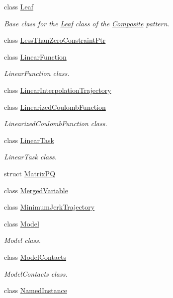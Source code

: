 \begin{DoxyCompactItemize}
class \hyperlink{classocra_1_1Leaf}{Leaf}
\begin{DoxyCompactList}\small\item\em Base class for the \hyperlink{classocra_1_1Leaf}{Leaf} class of the \hyperlink{classocra_1_1Composite}{Composite} pattern. \end{DoxyCompactList}\item 
class \hyperlink{classocra_1_1LessThanZeroConstraintPtr}{Less\+Than\+Zero\+Constraint\+Ptr}
\item 
class \hyperlink{classocra_1_1LinearFunction}{Linear\+Function}
\begin{DoxyCompactList}\small\item\em Linear\+Function class. \end{DoxyCompactList}\item 
class \hyperlink{classocra_1_1LinearInterpolationTrajectory}{Linear\+Interpolation\+Trajectory}
\item 
class \hyperlink{classocra_1_1LinearizedCoulombFunction}{Linearized\+Coulomb\+Function}
\begin{DoxyCompactList}\small\item\em Linearized\+Coulomb\+Function class. \end{DoxyCompactList}\item 
class \hyperlink{classocra_1_1LinearTask}{Linear\+Task}
\begin{DoxyCompactList}\small\item\em Linear\+Task class. \end{DoxyCompactList}\item 
struct \hyperlink{structocra_1_1MatrixPQ}{Matrix\+PQ}
\item 
class \hyperlink{classocra_1_1MergedVariable}{Merged\+Variable}
\item 
class \hyperlink{classocra_1_1MinimumJerkTrajectory}{Minimum\+Jerk\+Trajectory}
\item 
class \hyperlink{classocra_1_1Model}{Model}
\begin{DoxyCompactList}\small\item\em Model class. \end{DoxyCompactList}\item 
class \hyperlink{classocra_1_1ModelContacts}{Model\+Contacts}
\begin{DoxyCompactList}\small\item\em Model\+Contacts class. \end{DoxyCompactList}\item 
class \hyperlink{classocra_1_1NamedInstance}{Named\+Instance}

\end{DoxyCompactItemize}

